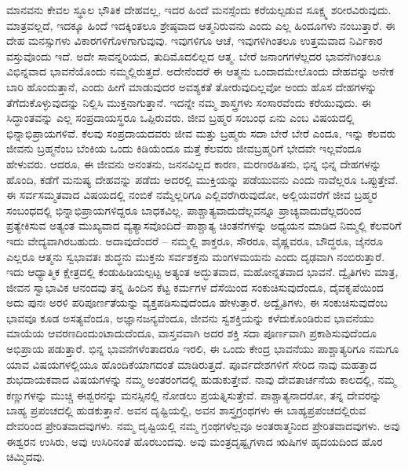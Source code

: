 ಮಾನವನು ಕೇವಲ ಸ್ಥೂಲ ಭೌತಿಕ ದೇಹವಲ್ಲ, ಇದರ ಹಿಂದೆ ಮನಸ್ಸೆಂದು ಕರೆಯಲ್ಪಡುವ ಸೂಕ್ಷ್ಮ ಶರೀರವಿರುವುದು. ಮಾತ್ರವಲ್ಲದೆ, ಇದಕ್ಕೂ ಹಿಂದೆ ಇದಕ್ಕಿಂತಲೂ ಶ್ರೇಷ್ಠವಾದ ಆತ್ಮನಿರುವನು ಎಂದು ಎಲ್ಲ ಹಿಂದೂಗಳು ನಂಬುತ್ತಾರೆ. ಈ ದೇಹ ಮನಸ್ಸುಗಳು ವಿಕಾರಗಳಿಗೊಳಗಾಗುವುವು. ಇವುಗಳಿಗೂ ಆಚೆ, ಇವುಗಳಿಗಿಂತಲೂ ಉತ್ತಮವಾದ ನಿರ್ವಿಕಾರ ವಸ್ತುವೊಂದು ಇದೆ. ಅದೇ ಸಾವನ್ನರಿಯದ, ತುದಿಮೊದಲಿಲ್ಲದ ಆತ್ಮ. ಬೇರೆ ಜನಾಂಗಗಳೆಲ್ಲದರ ಭಾವನೆಗಿಂತಲೂ ವಿಭಿನ್ನವಾದ ಭಾವನೆಯೊಂದು ನಮ್ಮಲ್ಲಿರುತ್ತದೆ. ಅದೇನೆಂದರೆ ಈ ಆತ್ಮನು ಒಂದಾದಮೇಲೊಂದು ದೇಹವನ್ನು ಅನೇಕ ಬಾರಿ ಹೊಂದುತ್ತಾನೆ, ಎಂದು ಹೀಗೆ ಮಾಡುವುದರ ಅವಶ್ಯಕತೆ ತೋರುವುದಿಲ್ಲವೋ ಅಂದು ಹೊಸ ದೇಹಗಳನ್ನು ತೆಗೆದುಕೊಳ್ಳುವುದನ್ನು ನಿಲ್ಲಿಸಿ ಮುಕ್ತನಾಗುತ್ತಾನೆ. ಇದನ್ನೇ ನಮ್ಮ ಶಾಸ್ತ್ರಗಳು ಸಂಸಾರವೆಂದು ಕರೆಯುವುದು. ಈ ಸಿದ್ಧಾಂತವನ್ನು ಎಲ್ಲ ಸಂಪ್ರದಾಯಸ್ಥರೂ ಒಪ್ಪಿರುವರು. ಜೀವ ಬ್ರಹ್ಮರ ಸಂಬಂಧ ಏನು ಎಂಬ ವಿಷಯದಲ್ಲಿ ಭಿನ್ನಾಭಿಪ್ರಾಯಗಳಿವೆ. ಕೆಲವು ಸಂಪ್ರದಾಯದವರು ಜೀವ ಮತ್ತು ಬ್ರಹ್ಮರು ಸದಾ ಬೇರೆ ಬೇರೆ ಎಂದೂ, ಇನ್ನು ಕೆಲವರು ಜೀವನು ಬ್ರಹ್ಮನೆಂಬ ಬೆಂಕಿಯ ಒಂದು ಕಿಡಿಯೆಂದೂ ಮತ್ತೆ ಕೆಲವರು ಜೀವಬ್ರಹ್ಮರಿಗೆ ಭೇದವೇ ಇಲ್ಲವೆಂದೂ ಹೇಳುವರು. ಆದರೂ, ಈ ಜೀವನು ಅನಂತನು, ಜನನವಿಲ್ಲದ ಕಾರಣ, ಮರಣರಹಿತನು, ಭಿನ್ನ ಭಿನ್ನ ದೇಹಗಳನ್ನು ಹೊಂದಿ, ಕಡೆಗೆ ಮನುಷ್ಯ ದೇಹವನ್ನು ಪಡೆದು ಅದರಲ್ಲಿ ಮುಕ್ತಿಯನ್ನು ಪಡೆಯುವನು ಎಂದು ನಾವೆಲ್ಲರೂ ಒಪ್ಪುತ್ತೇವೆ. ಈ ಸರ್ವಸಮ್ಮತವಾದ ವಿಷಯದಲ್ಲಿ ನಂಬಿಕೆ ನಮ್ಮೆಲ್ಲರಿಗೂ ಎಲ್ಲಿವರೆಗಿರುವುದೋ, ಅಲ್ಲಿಯವರೆಗೆ ಜೀವ ಬ್ರಹ್ಮರ ಸಂಬಂಧದಲ್ಲಿ ಭಿನ್ನಾಭಿಪ್ರಾಯಗಳಿದ್ದರೂ ಬಾಧಕವಿಲ್ಲ. ಪಾಶ್ಚಾತ್ಯವಾದುದೆಲ್ಲವನ್ನೂ ಪ್ರಾಚ್ಯವಾದುದೆಲ್ಲದರಿಂದ ಪ್ರತ್ಯೇಕಿಸುವ ಅತ್ಯಂತ ಮುಖ್ಯವಾದ ವ್ಯತ್ಯಾಸವೊಂದಿದೆ–ಪಾಶ್ಚಾತ್ಯ ಚಿಂತನೆಗಳನ್ನು ಅಧ್ಯಯನ ಮಾಡಿದ ನಿಮ್ಮಲ್ಲಿ ಕೆಲವರಿಗೆ ಇದು ವೇದ್ಯವಾಗಿರಬಹುದು. ಅದಾವುದೆಂದರೆ – ನಮ್ಮಲ್ಲಿ ಶಾಕ್ತರೂ, ಸೌರರೂ, ವೈಷ್ಣವರೂ, ಬೌದ್ಧರೂ, ಜೈನರೂ ಎಲ್ಲರೂ ಆತ್ಮನು ಸ್ವಭಾವತಃ ಶುದ್ಧನು ಮುಕ್ತನು ಸರ್ವಶಕ್ತನು ಮಂಗಳಮಯನು ಎಂದು ದೃಢವಾಗಿ ನಂಬಿರುತ್ತಾರೆ. ಇದು ಆಧ್ಯಾತ್ಮಿಕ ಕ್ಷೇತ್ರದಲ್ಲಿ ಕಂಡುಹಿಡಿಯಲ್ಪಟ್ಟ ಅತ್ಯಂತ ಅದ್ಭುತವಾದ, ಮಹೋನ್ನತವಾದ ಭಾವನೆ. ದ್ವೈತಿಗಳು ಮಾತ್ರ, ಜೀವನ ಸ್ವಾಭಾವಿಕ ಆನಂದವು ತನ್ನ ಹಿಂದಿನ ಕೆಟ್ಟ ಕರ್ಮಗಳ ದೆಸೆಯಿಂದ ಸಂಕುಚಿಸುವುದೆಂದೂ, ದೈವಕೃಪೆಯಿಂದ ಅದು ಪುನಃ ಅರಳಿ ಪರಿಪೂರ್ಣತೆಯನ್ನು ವ್ಯಕ್ತಪಡಿಸುವುದೆಂದೂ ಹೇಳುತ್ತಾರೆ. ಅದ್ವೈತಿಗಳು, ಈ ಸಂಕುಚಿಸುವುದೆಂಬ ಭಾವವೂ ಕೂಡ ಅಸತ್ಯವೆಂದೂ, ಅಜ್ಞಾನಜನ್ಯವೆಂದೂ, ಜೀವನು ಸ್ವಶಕ್ತಿಯನ್ನು ಕಳೆದುಕೊಂಡಿರುವ ಭಾವನೆಯು ಮಾಯೆಯ ಆವರಣದಿಂದುಂಟಾದುದೆಂದೂ, ವಾಸ್ತವವಾಗಿ ಅದರ ಶಕ್ತಿ ಸದಾ ಪೂರ್ಣವಾಗಿ ಪ್ರಕಾಶಿಸುವುದೆಂದೂ ಅಭಿಪ್ರಾಯ ಪಡುತ್ತಾರೆ. ಭಿನ್ನ ಭಾವನೆಗಳೆಂತಾದರೂ ಇರಲಿ, ಈ ಒಂದು ಕೇಂದ್ರ ಭಾವನೆಯು ಪಾಶ್ಚಾತ್ಯರಿಗೂ ನಮಗೂ ಯಾವ ವಿಷಯಗಳಲ್ಲಿಯೂ ಹೊಂದಿಕೆಯಾಗದಂತೆ ಮಾಡಿರುತ್ತದೆ. ಪೂರ್ವದೇಶಗಳಿಗೆ ಸೇರಿದ ನಾವು ಮಹತ್ತಾದ ಶುಭದಾಯಕವಾದ ವಿಷಯಗಳನ್ನು ನಮ್ಮ ಅಂತರಂಗದಲ್ಲಿ ಹುಡುಕುತ್ತೇವೆ. ನಾವು ದೇವತಾರ್ಚನೆಯ ಕಾಲದಲ್ಲಿ, ನಮ್ಮ ಕಣ್ಣುಗಳನ್ನು ಮುಚ್ಚಿ ಈಶ್ವರನನ್ನು ಮನಸ್ಸಿನಲ್ಲಿ ನೋಡಲು ಪ್ರಯತ್ನಿಸುತ್ತೇವೆ. ಪಾಶ್ಚಾತ್ಯನಾದರೋ, ತನ್ನ ದೇವರನ್ನು ಬಾಹ್ಯ ಪ್ರಪಂಚದಲ್ಲಿ ಹುಡಕುತ್ತಾನೆ. ಅವನ ದೃಷ್ಟಿಯಲ್ಲಿ, ಅವನ ಶಾಸ್ತ್ರಗ್ರಂಥಗಳು ಈ ಬಾಹ್ಯಪ್ರಪಂಚದಲ್ಲಿರುವ ದೇವರಿಂದ ಪ್ರೇರಿತವಾದವುಗಳು. ನಮ್ಮ ದೃಷ್ಟಿಯಲ್ಲಿ ನಮ್ಮ ಗ್ರಂಥಗಳೆಲ್ಲವೂ ಅಂತರಾತ್ಮನಿಂದ ಪ್ರೇರಿತವಾದವುಗಳು. ಅವು ಈಶ್ವರನ ಉಸಿರು, ಅವು ಉಸಿರಿನಂತೆ ಹೊರಬಂದವು. ಅವು ಮಂತ್ರದೃಷ್ಟೃಗಳಾದ ಋಷಿಗಳ ಹೃದಯದಿಂದ ಹೊರ ಚಿಮ್ಮಿದವು.

\vskip 2pt

